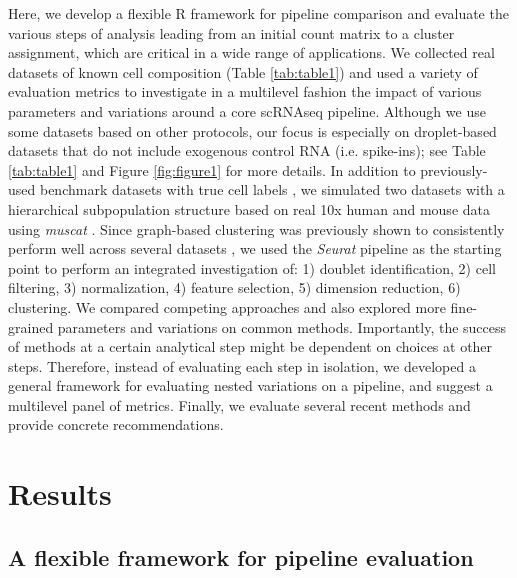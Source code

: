 \documentclass{bmcart}
\begin{document}
Here, we develop a flexible R framework for pipeline comparison and evaluate the various steps of analysis leading from an initial count matrix to a cluster assignment, which are critical in a wide range of applications. We collected real datasets of known cell composition (Table \ref{tab:table1}) and used a variety of evaluation metrics to investigate in a multilevel fashion the impact of various parameters and variations around a core scRNAseq pipeline. Although we use some datasets based on other protocols, our focus is especially on droplet-based datasets that do not include exogenous control RNA (i.e. spike-ins); see Table \ref{tab:table1} and Figure \ref{fig:figure1} for more details. In addition to previously-used benchmark datasets with true cell labels \cite{duoClustering2018,tianMixology2018}, we simulated two datasets with a hierarchical subpopulation structure based on real 10x human and mouse data using \textit{muscat} \cite{CrowellMuscat2019}. 
Since graph-based clustering \cite{satijaSeurat2015} was previously shown to consistently perform well across several datasets \cite{duoClustering2018,tianMixology2018}, we used the \textit{Seurat} pipeline as the starting point to perform an integrated investigation of: 1) doublet identification, 2) cell filtering, 3) normalization, 4) feature selection, 5) dimension reduction, 6) clustering. We compared competing approaches and also explored more fine-grained parameters and variations on common methods. Importantly, the success of methods at a certain analytical step might be dependent on choices at other steps. Therefore, instead of evaluating each step in isolation, we developed a general framework for evaluating nested variations on a pipeline, and suggest a multilevel panel of metrics. Finally, we evaluate several recent methods and provide concrete recommendations.

\section*{Results}

\subsection*{A flexible framework for pipeline evaluation}
\end{document}
